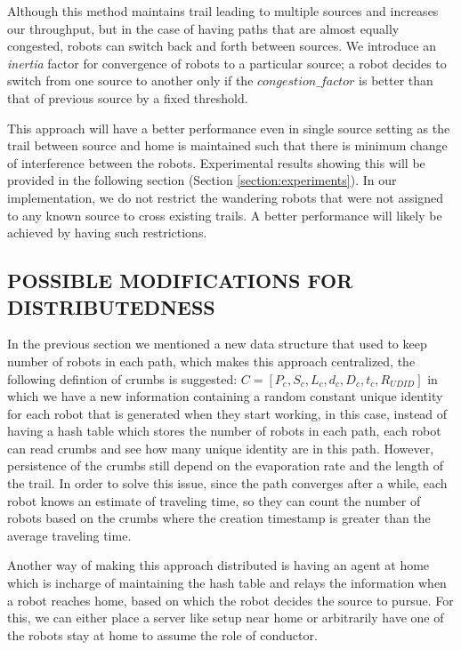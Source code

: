 \documentclass[letterpaper, 10 pt, conference]{ieeeconf}  %
\begin{document}
Although this method maintains trail leading to multiple sources and increases our throughput, but in the case of having paths that are almost equally congested, robots can switch back and forth between sources. We introduce an \emph{inertia} factor for convergence of robots to a particular source; a robot decides to switch from one source to another only if the $congestion\_factor$ is better than that of previous source by a fixed threshold.

This approach will have a better performance even in single source setting as the trail between source and home is maintained such that there is minimum change of interference between the robots. Experimental results showing this will be provided in the following section (Section \ref{section:experiments}). In our implementation, we do not restrict the wandering robots that were not assigned to any known source to cross existing trails. A better performance will likely be achieved by having such restrictions.

\subsection{POSSIBLE MODIFICATIONS FOR DISTRIBUTEDNESS}
In the previous section we mentioned a new data structure that used to keep number of robots in each path, which makes this approach centralized, the following defintion of crumbs is suggested: $C = [P_c, S_c, L_c, d_c, D_c, t_c, R_{UDID}]$ in which we have a new information containing a random constant unique identity for each robot that is generated when they start working, in this case, instead of having a hash table which stores the number of robots in each path, each robot can read crumbs and see how many unique identity are in this path. However, persistence of the crumbs still depend on the evaporation rate and the length of the trail. In order to solve this issue, since the path converges after a while, each robot knows an estimate of traveling time, so they can count the number of robots based on the crumbs where the creation timestamp is greater than the average traveling time.

Another way of making this approach distributed is having an agent at home which is incharge of maintaining the hash table and relays the information when a robot reaches home, based on which the robot decides the source to pursue. For this, we can either place a server like setup near home or arbitrarily have one of the robots stay at home to assume the role of conductor.
\end{document}
